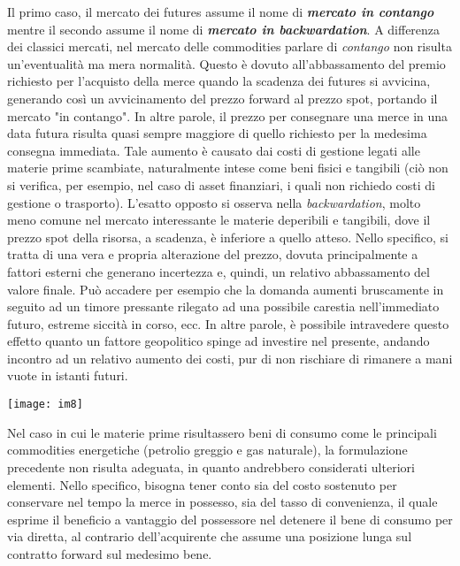 \documentclass[12pt,a4paper]{report}
\begin{document}
Il primo caso, il mercato dei futures assume il nome di \textbf{\textit{mercato in contango}} mentre il secondo assume il nome di \textbf{\textit{mercato in backwardation}}. A differenza dei classici mercati, nel mercato delle commodities parlare di \textit{contango} non risulta un'eventualità ma mera normalità. Questo è dovuto all'abbassamento del premio richiesto per l'acquisto della merce quando la scadenza dei futures si avvicina, generando così un avvicinamento del prezzo forward al prezzo spot, portando il mercato "in contango". In altre parole, il prezzo per consegnare una merce in una data futura risulta quasi sempre maggiore di quello richiesto per la medesima consegna immediata. Tale aumento è causato dai costi di gestione legati alle materie prime scambiate, naturalmente intese come beni fisici e tangibili (ciò non si verifica, per esempio, nel caso di asset finanziari, i quali non richiedo costi di gestione o trasporto).
L'esatto opposto si osserva nella \textit{backwardation}, molto meno comune nel mercato interessante le materie deperibili e tangibili, dove il prezzo spot della risorsa, a scadenza, è inferiore a quello atteso. Nello specifico, si tratta di una vera e propria alterazione del prezzo, dovuta principalmente a fattori esterni che generano incertezza e, quindi, un relativo abbassamento del valore finale. Può accadere per esempio che la domanda aumenti bruscamente in seguito ad un timore pressante rilegato ad una possibile carestia nell'immediato futuro, estreme siccità in corso, ecc. In altre parole, è possibile intravedere questo effetto quanto un fattore geopolitico spinge ad investire nel presente, andando incontro ad un relativo aumento dei costi, pur di non rischiare di rimanere a mani vuote in istanti futuri. 

\begin{center}
\texttt{[image: im8]}
\end{center}

Nel caso in cui le materie prime risultassero beni di consumo come le principali commodities energetiche (petrolio greggio e gas naturale), la formulazione precedente non risulta adeguata, in quanto andrebbero considerati ulteriori elementi. Nello specifico, bisogna tener conto sia del costo sostenuto per conservare nel tempo la merce in possesso, sia del tasso di convenienza, il quale esprime il beneficio a vantaggio del possessore nel detenere il bene di consumo per via diretta, al contrario dell'acquirente che assume una posizione lunga sul contratto forward sul medesimo bene.
\end{document}
